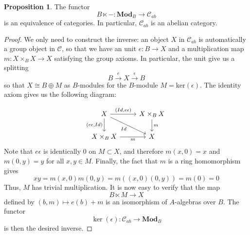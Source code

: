 \documentclass{article}
\theoremstyle{definition}
\theoremstyle{definition}
\theoremstyle{definition}
\theoremstyle{definition}
\newtheorem{proposition}{Proposition}[theorem]
\theoremstyle{definition}
\theoremstyle{definition}
\theoremstyle{definition}
\begin{document}
\begin{proposition}
	The functor 
	\[B\ltimes -: \textbf{Mod}_B\to \mathcal{C}_{ab}\]
	is an equivalence of categories. In particular, $\mathcal{C}_{ab}$ is an abelian category.
\end{proposition}
\begin{proof}
We only need to construct the inverse: an object $X$ in $\mathcal{C}_{ab}$ is automatically a group object in $\mathcal{C}$, so that we have an unit $e: B\to X$ and a multiplication map $m: X\times_B X\to X$ satisfying the group axioms. In particular, the unit give us a splitting 
\[B\xrightarrow{e} X\xrightarrow{\epsilon} B \] 
so that $X\cong B\oplus M$ as $B$-modules for the $B$-module $M=\textrm{ker}(\epsilon)$. The identity axiom gives us the following diagram:

\[\begin{tikzcd}
	X & {X\times_BX} \\
	{X\times_BX} & X
	\arrow["{(Id, e\epsilon)}", from=1-1, to=1-2]
	\arrow["{(e\epsilon,Id)}"', from=1-1, to=2-1]
	\arrow["Id"', from=1-1, to=2-2]
	\arrow["m", from=1-2, to=2-2]
	\arrow["m"', from=2-1, to=2-2]
\end{tikzcd}\]
Note that $e\epsilon$ is identically $0$ on $M\subset X$, and therefore $m(x,0)=x$ and $m(0,y)=y$ for all $x,y\in M$. Finally, the fact that $m$ is a ring homomorphism gives 
\[xy=m(x,0)m(0,y)=m((x,0)(0,y)) =m(0)=0\]
Thus, $M$ has trivial multiplication. It is now easy to verify that the map 
\[B\ltimes M\to X\]
defined by $(b,m)\mapsto e(b)+m$ is an isomorphism of $A$-algebras over $B$. The functor 
\[\ker(\epsilon): \mathcal{C}_{ab}\to \textbf{Mod}_B\]
is then the desired inverse.

\end{proof}
\end{document}
